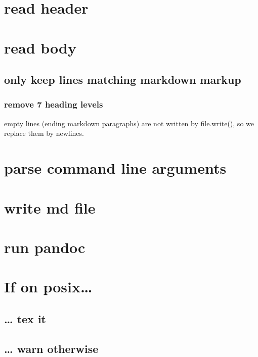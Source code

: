 \documentclass[]{article}
\begin{document}
\section{read header}\label{read-header}

\section{read body}\label{read-body}

\subsection{only keep lines matching markdown
markup}\label{only-keep-lines-matching-markdown-markup}

\subsubsection{remove 7 heading levels}\label{remove-7-heading-levels}

empty lines (ending markdown paragraphs) are not written by
file.write(), so we replace them by newlines.

\section{parse command line
arguments}\label{parse-command-line-arguments}

\section{write md file}\label{write-md-file}

\section{run pandoc}\label{run-pandoc}

\section{If on posix\ldots{}}\label{if-on-posix}

\subsection{\ldots{} tex it}\label{tex-it}

\subsection{\ldots{} warn otherwise}\label{warn-otherwise}
\end{document}
